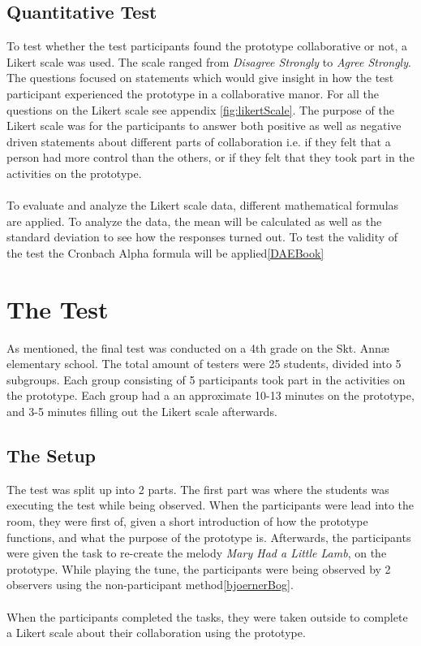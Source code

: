 \subsection{Quantitative Test}
To test whether the test participants found the prototype collaborative or not, a Likert scale was used. The scale ranged from \textit{Disagree Strongly} to \textit{Agree Strongly}. The questions focused on statements which would give insight in how the test participant experienced the prototype in a collaborative manor. For all the questions on the Likert scale see appendix \ref{fig:likertScale}. The purpose of the Likert scale was for the participants to answer both positive as well as negative driven statements about different parts of collaboration i.e. if they felt that a person had more control than the others, or if they felt that they took part in the activities on the prototype.\\\\

To evaluate and analyze the Likert scale data, different mathematical formulas are applied. To analyze the data, the mean will be calculated as well as the standard deviation to see how the responses turned out. To test the validity of the test the Cronbach Alpha formula will be applied\ref{DAEBook}

\section{The Test}
As mentioned, the final test was conducted on a 4th grade on the Skt. Annæ elementary school. The total amount of testers were 25 students,  divided into 5 subgroups. Each group consisting of 5 participants took part in the activities on the prototype. Each group had a an approximate 10-13 minutes on the prototype, and 3-5 minutes filling out the Likert scale afterwards.

\subsection{The Setup}
The test was split up into 2 parts. The first part was where the students was executing the test while being observed. When the participants were lead into the room, they were first of, given a short introduction of how the prototype functions, and what the purpose of the prototype is. Afterwards, the participants were given the task to re-create the melody \textit{Mary Had a Little Lamb}, on the prototype. While playing the tune, the participants were being observed by 2 observers using the non-participant method\ref{bjoernerBog}. \\\\
When the participants completed the tasks, they were taken outside to complete a Likert scale about their collaboration using the prototype. 

